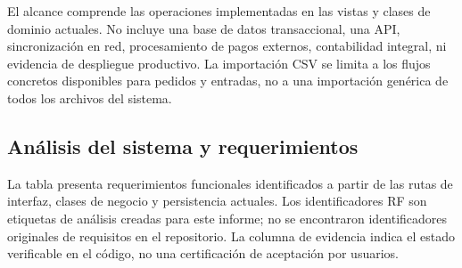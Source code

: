 El alcance comprende las operaciones implementadas en las vistas y clases de dominio actuales. No incluye una base de datos transaccional, una API, sincronización en red, procesamiento de pagos externos, contabilidad integral, ni evidencia de despliegue productivo. La importación CSV se limita a los flujos concretos disponibles para pedidos y entradas, no a una importación genérica de todos los archivos del sistema.

\subsection{Análisis del sistema y requerimientos}
\label{subsec:requerimientos}

La tabla presenta requerimientos funcionales identificados a partir de las rutas de interfaz, clases de negocio y persistencia actuales. Los identificadores RF son etiquetas de análisis creadas para este informe; no se encontraron identificadores originales de requisitos en el repositorio. La columna de evidencia indica el estado verificable en el código, no una certificación de aceptación por usuarios.

